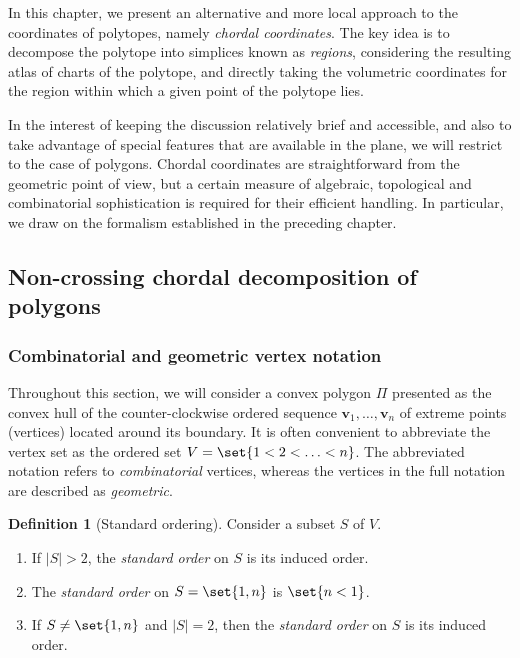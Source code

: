 \documentclass[12pt]{amsart}
\theoremstyle{plain}
\theoremstyle{definition}
\newtheorem{definition}[theorem]{Definition}
\numberwithin{equation}{section}
\begin{document}
In this chapter, we present an alternative and more local approach to the coordinates of polytopes, namely \emph{chordal coordinates}. The key idea is to decompose the polytope into simplices known as \emph{regions}, considering the resulting atlas of charts of the polytope, and directly taking the volumetric coordinates for the region within which a given point of the polytope lies.

In the interest of keeping the discussion relatively brief and accessible, and also to take advantage of special features that are available in the plane, we will restrict to the case of polygons.
Chordal coordinates are straightforward from the geometric point of view, but a certain measure of algebraic, topological and combinatorial sophistication is required for their efficient handling. In particular, we draw on the formalism established in the preceding chapter.


\subsection{Non-crossing chordal decomposition of polygons}


\subsubsection{Combinatorial and geometric vertex notation}\label{SSS:CombGeom}


Throughout this section, we will consider a convex polygon $\Pi$ presented as the convex hull of the counter-clockwise ordered sequence $\mathbf v_1,\dots,\mathbf v_n$ of extreme points (vertices) located around its boundary. It is often convenient to abbreviate the vertex set as the ordered set $V=\set{1<2<\ldots<n}$. The abbreviated notation refers to \emph{combinatorial} vertices, whereas the vertices in the full notation are described as \emph{geometric}.


\begin{definition}[Standard ordering]\label{D:OrdSbSet}
Consider a subset $S$ of $V$.
\begin{enumerate}
\item[$(\mathrm a)$]
If $|S|>2$, the \emph{standard order} on $S$ is its induced order.
\item[$(\mathrm b)$]
The \emph{standard order} on $S=\set{1,n}$ is $\set{n<1}$.
\item[$(\mathrm c)$]
If $S\ne\set{1,n}$ and $|S|=2$, then the \emph{standard order} on $S$ is its induced order.
\end{enumerate}
\end{definition}
\end{document}
